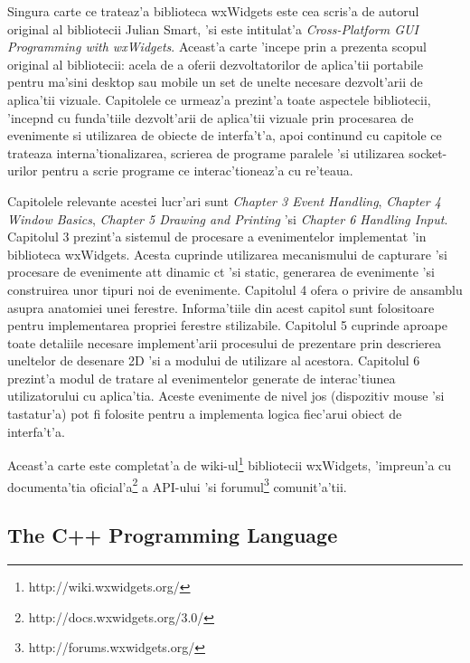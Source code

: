 \medskip

Singura carte ce trateaz'a biblioteca wxWidgets este cea scris'a de autorul original al bibliotecii Julian Smart, 'si este intitulat'a \emph{Cross-Platform GUI Programming with wxWidgets}\cite{wxwidgetsguide}. Aceast'a carte 'incepe prin a prezenta scopul original al bibliotecii: acela de a oferii dezvoltatorilor de aplica'tii portabile pentru ma'sini desktop sau mobile un set de unelte necesare dezvolt'arii de aplica'tii vizuale. Capitolele ce urmeaz'a prezint'a toate aspectele bibliotecii, 'incep{\ia}nd cu funda'tiile dezvolt'arii de aplica'tii vizuale prin procesarea de evenimente si utilizarea de obiecte de interfa't'a, apoi continu{\ia}nd cu capitole ce trateaza interna'tionalizarea, scrierea de programe paralele 'si utilizarea socket-urilor pentru a scrie programe ce interac'tioneaz'a cu re'teaua.

\medskip

Capitolele relevante acestei lucr'ari sunt \emph{Chapter 3 Event Handling}, \emph{Chapter 4 Window Basics}, \emph{Chapter 5 Drawing and Printing} 'si \emph{Chapter 6 Handling Input}. Capitolul 3 prezint'a sistemul de procesare a evenimentelor implementat 'in biblioteca wxWidgets. Acesta cuprinde utilizarea mecanismului de capturare 'si procesare de evenimente at{\ia}t dinamic c{\ia}t 'si static, generarea de evenimente 'si construirea unor tipuri noi de evenimente. Capitolul 4 ofera o privire de ansamblu asupra anatomiei unei ferestre. Informa'tiile din acest capitol sunt folositoare pentru implementarea propriei ferestre stilizabile. Capitolul 5 cuprinde aproape toate detaliile necesare implement'arii procesului de prezentare prin descrierea uneltelor de desenare 2D 'si a modului de utilizare al acestora. Capitolul 6 prezint'a modul de tratare al evenimentelor generate de interac'tiunea utilizatorului cu aplica'tia. Aceste evenimente de nivel jos (dispozitiv mouse 'si tastatur'a) pot fi folosite pentru a implementa logica fiec'arui obiect de interfa't'a.

Aceast'a carte este completat'a de wiki-ul\footnote{http://wiki.wxwidgets.org/} bibliotecii wxWidgets, 'impreun'a cu documenta'tia oficial'a\footnote{http://docs.wxwidgets.org/3.0/} a API-ului 'si forumul\footnote{http://forums.wxwidgets.org/} comunit'a'tii.

\subsection{The C++ Programming Language}


